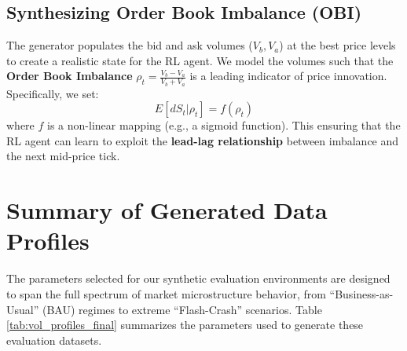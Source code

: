 \subsection{Synthesizing Order Book Imbalance (OBI)}
The generator populates the bid and ask volumes ($V_b, V_a$) at the best price levels to create a realistic state for the RL agent. We model the volumes such that the \textbf{Order Book Imbalance} $\rho_t = \frac{V_b - V_a}{V_b + V_a}$ is a leading indicator of price innovation. Specifically, we set:
\begin{equation}
    E[dS_t | \rho_t] = f(\rho_t)
\end{equation}
where $f$ is a non-linear mapping (e.g., a sigmoid function). This ensuring that the RL agent can learn to exploit the \textbf{lead-lag relationship} between imbalance and the next mid-price tick.

\section{Summary of Generated Data Profiles}

The parameters selected for our synthetic evaluation environments are designed to span the full spectrum of market microstructure behavior, from ``Business-as-Usual'' (BAU) regimes to extreme ``Flash-Crash'' scenarios. Table \ref{tab:vol_profiles_final} summarizes the parameters used to generate these evaluation datasets.

\begin{table}[h!]
    \centering
    \caption{Parameters for Synthetic Dataset Generation Across Volatility Regimes.}
    \label{tab:vol_profiles_final}
\end{table}

